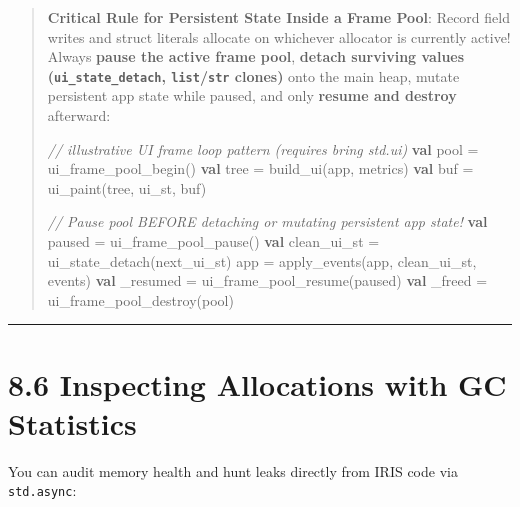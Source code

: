 \documentclass[
  english,
  oneside]{book}
\newenvironment{Shaded}{\begin{snugshade}}{\end{snugshade}}
\newcommand{\CommentTok}[1]{\textcolor[rgb]{0.42,0.60,0.33}{\textit{#1}}}
\newcommand{\KeywordTok}[1]{\textcolor[rgb]{0.34,0.61,0.84}{\textbf{#1}}}
\newcommand{\NormalTok}[1]{\textcolor[rgb]{0.83,0.83,0.83}{#1}}
\newcommand{\OperatorTok}[1]{\textcolor[rgb]{0.83,0.83,0.83}{#1}}
\begin{document}
\begin{quote}
\textbf{Critical Rule for Persistent State Inside a Frame Pool}: Record
field writes and struct literals allocate on whichever allocator is
currently active! Always \textbf{pause the active frame pool},
\textbf{detach surviving values (\texttt{ui\_state\_detach},
\texttt{list}/\texttt{str} clones)} onto the main heap, mutate
persistent app state while paused, and only \textbf{resume and destroy}
afterward:

\begin{Shaded}
\begin{Highlighting}[]
\CommentTok{// illustrative UI frame loop pattern (requires \textasciigrave{}bring std.ui\textasciigrave{})}
\KeywordTok{val}\NormalTok{ pool }\OperatorTok{=}\NormalTok{ ui\_frame\_pool\_begin()}
\KeywordTok{val}\NormalTok{ tree }\OperatorTok{=}\NormalTok{ build\_ui(app, metrics)}
\KeywordTok{val}\NormalTok{ buf }\OperatorTok{=}\NormalTok{ ui\_paint(tree, ui\_st, buf)}

\CommentTok{// Pause pool BEFORE detaching or mutating persistent \textasciigrave{}app\textasciigrave{} state!}
\KeywordTok{val}\NormalTok{ paused }\OperatorTok{=}\NormalTok{ ui\_frame\_pool\_pause()}
\KeywordTok{val}\NormalTok{ clean\_ui\_st }\OperatorTok{=}\NormalTok{ ui\_state\_detach(next\_ui\_st)}
\NormalTok{app }\OperatorTok{=}\NormalTok{ apply\_events(app, clean\_ui\_st, events)}
\KeywordTok{val}\NormalTok{ \_resumed }\OperatorTok{=}\NormalTok{ ui\_frame\_pool\_resume(paused)}
\KeywordTok{val}\NormalTok{ \_freed }\OperatorTok{=}\NormalTok{ ui\_frame\_pool\_destroy(pool)}
\end{Highlighting}
\end{Shaded}
\end{quote}

\begin{center}\rule{0.5\linewidth}{0.5pt}\end{center}

\section{8.6 Inspecting Allocations with GC
Statistics}\label{inspecting-allocations-with-gc-statistics}

You can audit memory health and hunt leaks directly from IRIS code via
\texttt{std.async}:
\end{document}
